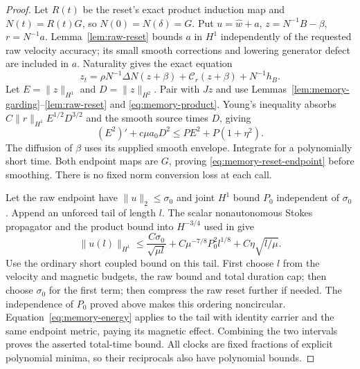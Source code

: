 \documentclass[11pt,a4paper]{amsart}
\theoremstyle{definition}
\theoremstyle{remark}
\numberwithin{equation}{section}
\newcommand{\Ccal}{\mathcal C}
\newcommand{\norm}[1]{\lVert #1\rVert}
\begin{document}
\begin{proof}
Let $R(t)$ be the reset's exact product induction map and
$N(t)=R(t)G$, so $N(0)=N(\delta)=G$.  Put
$u=\widehat w+a$, $z=N^{-1}B-\beta$, $r=N^{-1}a$.
Lemma~\ref{lem:raw-reset} bounds $a$ in $H^1$ independently of the requested
raw velocity accuracy; its small smooth corrections and lowering generator
defect are included in $a$.  Naturality gives the exact equation
\begin{equation}\label{eq:memory-z}
 z_t=\rho N^{-1}\Delta N(z+\beta)
                 +\Ccal_r(z+\beta)+N^{-1}h_B.
\end{equation}
Let $E=\norm z_{H^1}$ and $D=\norm z_{H^2}$.  Pair with $Jz$ and use
Lemmas~\ref{lem:memory-garding}--\ref{lem:raw-reset} and
\eqref{eq:memory-product}.  Young's inequality absorbs
$C\norm r_{H^1}E^{1/2}D^{3/2}$ and the smooth source times $D$, giving
\begin{equation}\label{eq:memory-energy}
 (E^2)'+c\mu a_0D^2\le P E^2+P(1+\eta^2).
\end{equation}
The diffusion of $\beta$ uses its supplied smooth envelope.  Integrate
for a polynomially short time.  Both endpoint maps are $G$, proving
\eqref{eq:memory-reset-endpoint} before smoothing.  There is no fixed norm
conversion loss at each call.

Let the raw endpoint have $\norm u_2\le\sigma_0$ and joint $H^1$ bound
$P_0$ independent of $\sigma_0$.  Append an unforced tail of length $l$.
The scalar nonautonomous Stokes propagator and the product bound into
$H^{-3/4}$ used in \cite[Lemma~5.1]{Common} give
\begin{equation}\label{eq:memory-smoothing}
 \norm{u(l)}_{H^1}\le
 \frac{C\sigma_0}{\sqrt{\mu l}}
       +C\mu^{-7/8}P_0^2l^{1/8}+C\eta\sqrt{l/\mu}.
\end{equation}
Use the ordinary short coupled bound on this tail.  First choose $l$ from
the velocity and magnetic budgets, the raw bound and total duration cap;
then choose $\sigma_0$ for the first term; then compress the raw reset
further if needed.  The independence of $P_0$ proved above makes this
ordering noncircular.  Equation~\eqref{eq:memory-energy} applies to the
tail with identity carrier and the same endpoint metric, paying its
magnetic effect.  Combining the two intervals proves the asserted
total-time bound.  All clocks are fixed fractions of explicit polynomial
minima, so their reciprocals also have polynomial bounds.
\end{proof}
\end{document}
